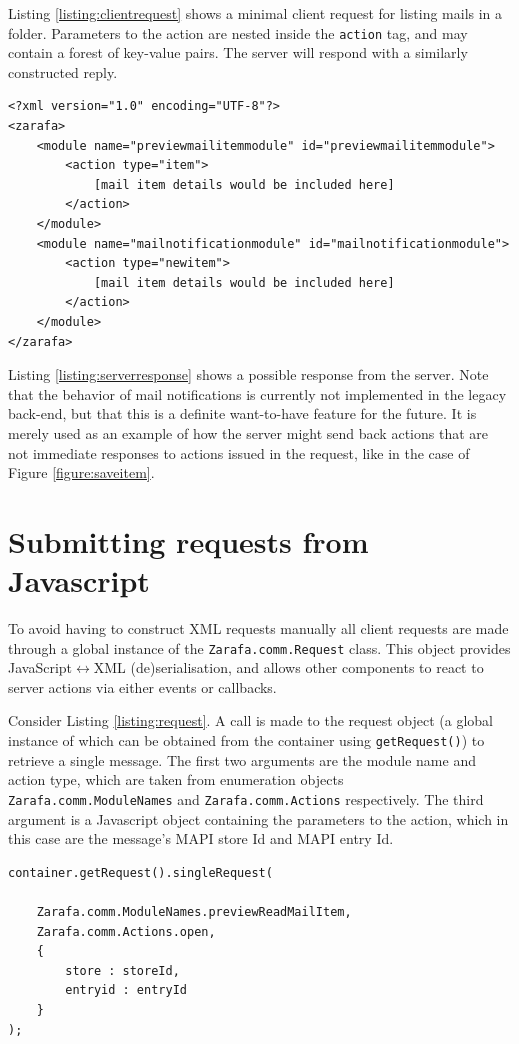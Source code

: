 Listing \ref{listing:clientrequest} shows a minimal client request for listing mails in a folder. Parameters
to the action are nested inside the {\tt action} tag, and may contain a forest of key-value pairs. The
server will respond with a similarly constructed reply. 

\begin{lstlisting}[caption={Client server communication: server response}, label=listing:serverresponse]
<?xml version="1.0" encoding="UTF-8"?>
<zarafa>
	<module name="previewmailitemmodule" id="previewmailitemmodule">
		<action type="item">
			[mail item details would be included here]
		</action>
	</module>
	<module name="mailnotificationmodule" id="mailnotificationmodule">
		<action type="newitem">
			[mail item details would be included here]
		</action>
	</module>
</zarafa>
\end{lstlisting}

Listing \ref{listing:serverresponse} shows a possible response from the server. Note that the behavior of 
mail notifications is currently not implemented in the legacy back-end, but that this is a definite want-to-have 
feature for the future. It is merely used as an example of how the server might send back actions that are 
not immediate responses to actions issued in the request, like in the case of Figure \ref{figure:saveitem}.

\section{Submitting requests from Javascript}
\label{section:jsrequests}

To avoid having to construct XML requests manually all client requests are made through a global instance of the
{\tt Zarafa.comm.Request} class. This object provides JavaScript$\leftrightarrow$XML (de)serialisation, and allows 
other components to react to server actions via either events or callbacks.

Consider Listing \ref{listing:request}. A call is made to the request object (a global instance of which
can be obtained from the container using {\tt getRequest()}) to retrieve a single message. The first two 
arguments are the module name and action type, which are taken from enumeration objects 
{\tt Zarafa.comm.ModuleNames} and
{\tt Zarafa.comm.Actions} respectively. The third argument is a Javascript object containing the parameters
to the action, which in this case are the message's MAPI store Id and MAPI entry Id. 

\begin{lstlisting}[caption={Submitting a request}, label=listing:request]
container.getRequest().singleRequest(

	Zarafa.comm.ModuleNames.previewReadMailItem,
	Zarafa.comm.Actions.open,
	{
		store : storeId,
		entryid : entryId
	}
);
\end{lstlisting}

